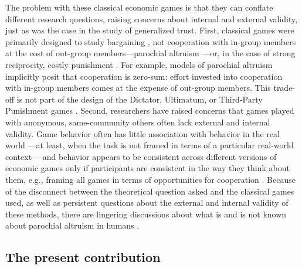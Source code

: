 \documentclass[bibauthoryear]{aa}
\begin{document}
The problem with these classical economic games is that they can conflate different research questions, raising concerns about internal and external validity, just as was the case in the study of generalized trust. First, classical games were primarily designed to study bargaining \citep{Camerer1995}, not cooperation with in-group members at the cost of out-group members---parochial altruism \citep[e.g.,][]{yamagishi2016parochial}---or, in the case of strong reciprocity, costly punishment \citep{hagen2006game, guala2012reciprocity}. For example, models of parochial altruism implicitly posit that cooperation is zero-sum: effort invested into cooperation with in-group members comes at the expense of out-group members. This trade-off is not part of the design of the Dictator, Ultimatum, or Third-Party Punishment games \citep[see][for relevant disucssion]{Gil-white2004}. Second, researchers have raised concerns that games played with anonymous, same-community others often lack external and internal validity. Game behavior often has little association with behavior in the real world \citep{gurven2008collective, winking2013natural}---at least, when the task is not framed in terms of a particular real-world context \citep{cronk2007influence, hagen2006game, lesorogol2005experiments, lesorogol2007bringing, pisor2012importing, lightner2017}---and behavior appears to be consistent across different versions of economic games only if participants are consistent in the way they think about them, e.g., framing all games in terms of opportunities for cooperation \citep{yamagishi2013behavioral}. Because of the disconnect between the theoretical question asked and the classical games used, as well as persistent questions about the external and internal validity of these methods, there are lingering discussions about what is and is not known about parochial altruism in humans \citep{Rusch2014,yamagishi2016parochial}.

\subsection{The present contribution}
\end{document}
